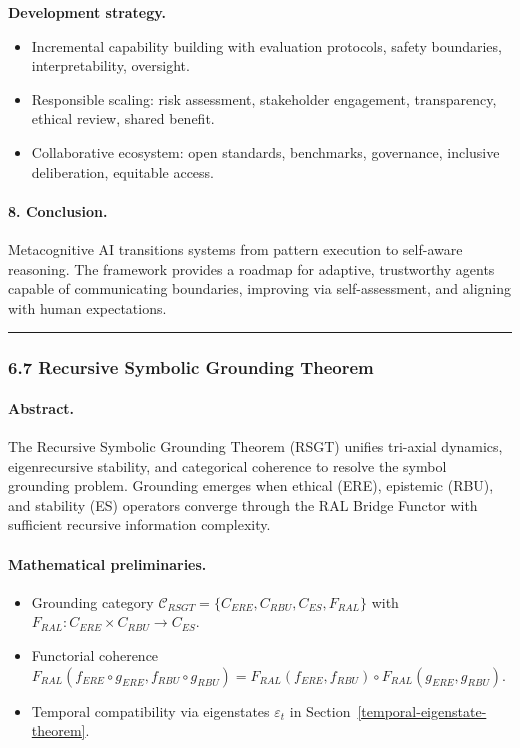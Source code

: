 \documentclass[12pt]{article}
\begin{document}
\textbf{Development strategy.}
\begin{itemize}
\item Incremental capability building with evaluation protocols, safety boundaries, interpretability, oversight.
\item Responsible scaling: risk assessment, stakeholder engagement, transparency, ethical review, shared benefit.
\item Collaborative ecosystem: open standards, benchmarks, governance, inclusive deliberation, equitable access.
\end{itemize}

\paragraph{8. Conclusion.}
Metacognitive AI transitions systems from pattern execution to self-aware reasoning. The framework provides a roadmap for adaptive, trustworthy agents capable of communicating boundaries, improving via self-assessment, and aligning with human expectations.

\begin{center}\rule{0.5\linewidth}{0.5pt}\end{center}

\subsubsection{\texorpdfstring{\textbf{6.7 Recursive Symbolic Grounding Theorem}}{6.7 Recursive Symbolic Grounding Theorem}}\label{symbolic-grounding-framework}

\paragraph{Abstract.}
The Recursive Symbolic Grounding Theorem (RSGT) unifies tri-axial dynamics, eigenrecursive stability, and categorical coherence to resolve the symbol grounding problem. Grounding emerges when ethical (ERE), epistemic (RBU), and stability (ES) operators converge through the RAL Bridge Functor with sufficient recursive information complexity.

\paragraph{Mathematical preliminaries.}
\begin{itemize}
\item Grounding category $\mathcal{C}_{RSGT} = \{C_{ERE}, C_{RBU}, C_{ES}, F_{RAL}\}$ with $F_{RAL}: C_{ERE}\times C_{RBU} \rightarrow C_{ES}$.
\item Functorial coherence $F_{RAL}(f_{ERE}\circ g_{ERE}, f_{RBU}\circ g_{RBU}) = F_{RAL}(f_{ERE}, f_{RBU})\circ F_{RAL}(g_{ERE}, g_{RBU})$.
\item Temporal compatibility via eigenstates $\varepsilon_t$ in Section~\ref{temporal-eigenstate-theorem}.
\end{itemize}
\end{document}
